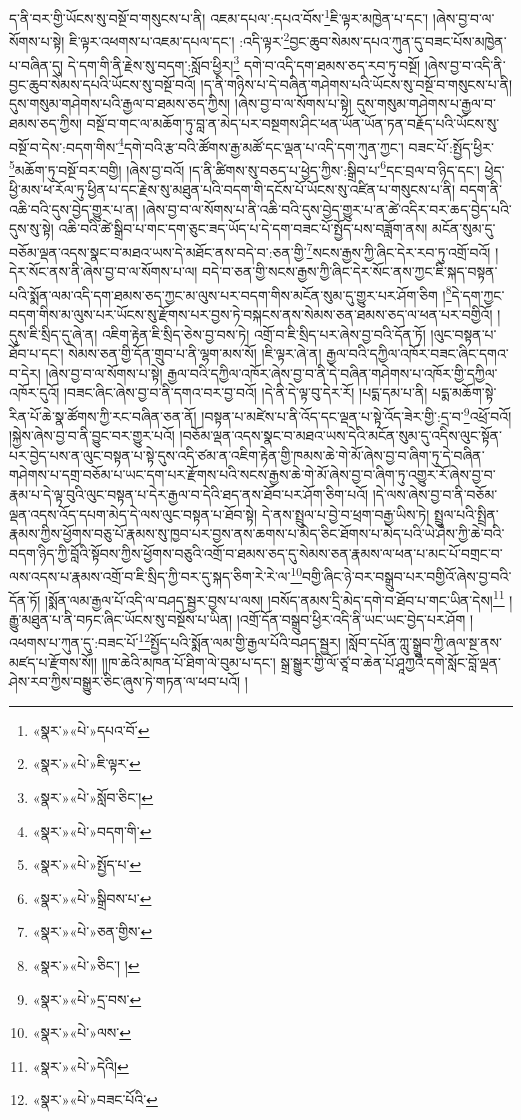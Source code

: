 ད་ནི་བར་གྱི་ཡོངས་སུ་བསྔོ་བ་གསུངས་པ་ནི། འཇམ་དཔལ་:དཔའ་བོས་\footnote{«སྣར་»«པེ་»དཔའ་བོ་}ཇི་ལྟར་མཁྱེན་པ་དང་། །ཞེས་བྱ་བ་ལ་སོགས་པ་སྟེ། ཇི་ལྟར་འཕགས་པ་འཇམ་དཔལ་དང་། :འདི་ལྟར་\footnote{«སྣར་»«པེ་»ཇི་ལྟར་}བྱང་ཆུབ་སེམས་དཔའ་ཀུན་དུ་བཟང་པོས་མཁྱེན་པ་བཞིན་དུ། དེ་དག་གི་ནི་རྗེས་སུ་བདག་:སློབ་ཕྱིར།\footnote{«སྣར་»«པེ་»སློབ་ཅིང་།} དགེ་བ་འདི་དག་ཐམས་ཅད་རབ་ཏུ་བསྔོ། །ཞེས་བྱ་བ་འདི་ནི་བྱང་ཆུབ་སེམས་དཔའི་ཡོངས་སུ་བསྔོ་བའོ། །ད་ནི་གཉིས་པ་དེ་བཞིན་གཤེགས་པའི་ཡོངས་སུ་བསྔོ་བ་གསུངས་པ་ནི། དུས་གསུམ་གཤེགས་པའི་རྒྱལ་བ་ཐམས་ཅད་ཀྱིས། །ཞེས་བྱ་བ་ལ་སོགས་པ་སྟེ། དུས་གསུམ་གཤེགས་པ་རྒྱལ་བ་ཐམས་ཅད་ཀྱིས། བསྔོ་བ་གང་ལ་མཆོག་ཏུ་བླ་ན་མེད་པར་བསྔགས་ཤིང་ཕན་ཡོན་ཡོན་ཏན་བརྗོད་པའི་ཡོངས་སུ་བསྔོ་བ་དེས་:བདག་གིས་\footnote{«སྣར་»«པེ་»བདག་གི་}དགེ་བའི་རྩ་བའི་ཚོགས་རྒྱ་མཚོ་དང་ལྡན་པ་འདི་དག་ཀུན་ཀྱང་། བཟང་པོ་:སྤྱོད་ཕྱིར་\footnote{«སྣར་»«པེ་»སྤྱོད་པ་}མཆོག་ཏུ་བསྔོ་བར་བགྱི། །ཞེས་བྱ་བའོ། །ད་ནི་ཚིགས་སུ་བཅད་པ་ཕྱེད་ཀྱིས་:སྒྲིབ་པ་\footnote{«སྣར་»«པེ་»སྒྲིབས་པ་}དང་བྲལ་བ་ཉིད་དང་། ཕྱེད་ཕྱི་མས་ཕ་རོལ་ཏུ་ཕྱིན་པ་དང་རྗེས་སུ་མཐུན་པའི་བདག་གི་དངོས་པོ་ཡོངས་སུ་འཛིན་པ་གསུངས་པ་ནི། བདག་ནི་འཆི་བའི་དུས་བྱེད་གྱུར་པ་ན། །ཞེས་བྱ་བ་ལ་སོགས་པ་ནི་འཆི་བའི་དུས་བྱེད་གྱུར་པ་ན་ཚེ་འདིར་བར་ཆད་བྱེད་པའི་དུས་སུ་སྟེ། འཆི་བའི་ཚེ་སྒྲིབ་པ་གང་དག་ཅུང་ཟད་ཡོད་པ་དེ་དག་བཟང་པོ་སྤྱོད་པས་བཟློག་ནས། མངོན་སུམ་དུ་བཅོམ་ལྡན་འདས་སྣང་བ་མཐའ་ཡས་དེ་མཐོང་ནས་བདེ་བ་:ཅན་གྱི་\footnote{«སྣར་»«པེ་»ཅན་གྱིས་}སངས་རྒྱས་ཀྱི་ཞིང་དེར་རབ་ཏུ་འགྲོ་བའོ། །དེར་སོང་ནས་ནི་ཞེས་བྱ་བ་ལ་སོགས་པ་ལ། བདེ་བ་ཅན་གྱི་སངས་རྒྱས་ཀྱི་ཞིང་དེར་སོང་ནས་ཀྱང་ཇི་སྐད་བསྟན་པའི་སྨོན་ལམ་འདི་དག་ཐམས་ཅད་ཀྱང་མ་ལུས་པར་བདག་གིས་མངོན་སུམ་དུ་གྱུར་པར་ཤོག་ཅིག །\footnote{«སྣར་»«པེ་»ཅིང་། །}དེ་དག་ཀྱང་བདག་གིས་མ་ལུས་པར་ཡོངས་སུ་རྫོགས་པར་བྱས་ཏེ་བསྐངས་ནས་སེམས་ཅན་ཐམས་ཅད་ལ་ཕན་པར་བགྱིའོ། །དུས་ཇི་སྲིད་དུ་ཞེ་ན། འཇིག་རྟེན་ཇི་སྲིད་ཅེས་བྱ་བས་ཏེ། འགྲོ་བ་ཇི་སྲིད་པར་ཞེས་བྱ་བའི་དོན་ཏོ། །ལུང་བསྟན་པ་ཐོབ་པ་དང་། སེམས་ཅན་གྱི་དོན་གྲུབ་པ་ནི་ལྷག་མས་སོ། །ཇི་ལྟར་ཞེ་ན། རྒྱལ་བའི་དཀྱིལ་འཁོར་བཟང་ཞིང་དགའ་བ་དེར། །ཞེས་བྱ་བ་ལ་སོགས་པ་སྟེ། རྒྱལ་བའི་དཀྱིལ་འཁོར་ཞེས་བྱ་བ་ནི་དེ་བཞིན་གཤེགས་པ་འཁོར་གྱི་དཀྱིལ་འཁོར་དུའོ། །བཟང་ཞིང་ཞེས་བྱ་བ་ནི་དགའ་བར་བྱ་བའོ། །དེ་ནི་དེ་ལྟ་བུ་དེར་རོ། །པདྨ་དམ་པ་ནི། པདྨ་མཆོག་སྟེ་རིན་པོ་ཆེ་སྣ་ཚོགས་ཀྱི་རང་བཞིན་ཅན་ནོ། །བསྟན་པ་མཛེས་པ་ནི་འོད་དང་ལྡན་པ་སྟེ་འོད་ཟེར་གྱི་:དྲ་བ་\footnote{«སྣར་»«པེ་»དྲ་བས་}འཕྲོ་བའོ། །སྐྱེས་ཞེས་བྱ་བ་ནི་བྱུང་བར་གྱུར་པའོ། །བཅོམ་ལྡན་འདས་སྣང་བ་མཐའ་ཡས་དེའི་མངོན་སུམ་དུ་འདིས་ལུང་སྟོན་པར་བྱེད་པས་ན་ལུང་བསྟན་པ་སྟེ་དུས་འདི་ཙམ་ན་འཇིག་རྟེན་གྱི་ཁམས་ཆེ་གེ་མོ་ཞེས་བྱ་བ་ཞིག་ཏུ་དེ་བཞིན་གཤེགས་པ་དགྲ་བཅོམ་པ་ཡང་དག་པར་རྫོགས་པའི་སངས་རྒྱས་ཆེ་གེ་མོ་ཞེས་བྱ་བ་ཞིག་ཏུ་འགྱུར་རོ་ཞེས་བྱ་བ་རྣམ་པ་དེ་ལྟ་བུའི་ལུང་བསྟན་པ་དེར་རྒྱལ་བ་དེའི་ཐད་ནས་ཐོབ་པར་ཤོག་ཅིག་པའོ། །དེ་ལས་ཞེས་བྱ་བ་ནི་བཅོམ་ལྡན་འདས་འོད་དཔག་མེད་དེ་ལས་ལུང་བསྟན་པ་ཐོབ་སྟེ། དེ་ནས་སྤྲུལ་པ་བྱེ་བ་ཕྲག་བརྒྱ་ཡིས་ཏེ། སྤྲུལ་པའི་སྤྲིན་རྣམས་ཀྱིས་ཕྱོགས་བཅུ་པོ་རྣམས་སུ་ཁྱབ་པར་བྱས་ནས་ཆགས་པ་མེད་ཅིང་ཐོགས་པ་མེད་པའི་ཡེ་ཤེས་ཀྱི་ཆེ་བའི་བདག་ཉིད་ཀྱི་བློའི་སྟོབས་ཀྱིས་ཕྱོགས་བཅུའི་འགྲོ་བ་ཐམས་ཅད་དུ་སེམས་ཅན་རྣམས་ལ་ཕན་པ་མང་པོ་བགྲང་བ་ལས་འདས་པ་རྣམས་འགྲོ་བ་ཇི་སྲིད་ཀྱི་བར་དུ་སྐད་ཅིག་རེ་རེ་ལ་\footnote{«སྣར་»«པེ་»ལས་}བགྱི་ཞིང་ཉེ་བར་བསྒྲུབ་པར་བགྱིའོ་ཞེས་བྱ་བའི་དོན་ཏོ། །སྨོན་ལམ་རྒྱལ་པོ་འདི་ལ་བཤད་སྦྱར་བྱས་པ་ལས། །བསོད་ནམས་དྲི་མེད་དགེ་བ་ཐོབ་པ་གང་ཡིན་དེས།\footnote{«སྣར་»«པེ་»དེའི།} །རྒྱུ་མཐུན་པ་ནི་བཏང་ཞིང་ཡོངས་སུ་བསྔོས་པ་ཡིན། །འགྲོ་དོན་བསྒྲུབ་ཕྱིར་འདི་ནི་ཡང་ཡང་བྱེད་པར་ཤོག །འཕགས་པ་ཀུན་དུ་:བཟང་པོ་\footnote{«སྣར་»«པེ་»བཟང་པོའི་}སྤྱོད་པའི་སྨོན་ལམ་གྱི་རྒྱལ་པོའི་བཤད་སྦྱར། །སློབ་དཔོན་ཀླུ་སྒྲུབ་ཀྱི་ཞལ་སྔ་ནས་མཛད་པ་རྫོགས་སོ།། །།ཁ་ཆེའི་མཁན་པོ་ཐིག་ལེ་བུམ་པ་དང་། སྒྲ་སྒྱུར་གྱི་ལོ་ཙཱ་བ་ཆེན་པོ་ཤཱཀྱའི་དགེ་སློང་བློ་ལྡན་ཤེས་རབ་ཀྱིས་བསྒྱུར་ཅིང་ཞུས་ཏེ་གཏན་ལ་ཕབ་པའོ། ། 